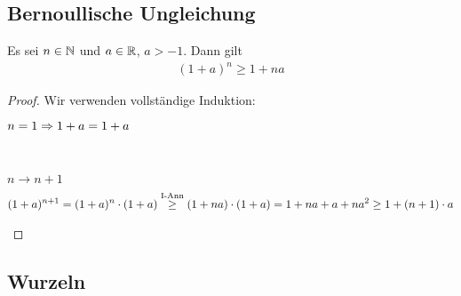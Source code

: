 \subsection{Bernoullische Ungleichung}

\begin{satz}
    \label{satz:bernoulli-ungleichung}
    Es sei $n\in\mathbb{N}$ und $a\in\mathbb{R}$, $a > -1$. Dann gilt
    \begin{align*}
    (1+a)
        ^n \geq 1+na
    \end{align*}
    \begin{proof}
        Wir verwenden vollständige Induktion:\\
        \begin{induktionsanfang}
            $n=1 \Rightarrow{} 1+a = 1+a$
        \end{induktionsanfang}
        \\
        \begin{induktionsschritt}
            $n\rightarrow n+1$
            \begin{align*}
            (1+a)
                ^{n+1} = (1+a)^n\cdot (1+a) \overset{\text{I-Ann}}{\geq} (1+na)\cdot(1+a) = 1+na+a+na^2\geq 1+(n+1)\cdot a
            \end{align*}
        \end{induktionsschritt}
    \end{proof}
\end{satz}


\newpage

\subsection{Wurzeln}

